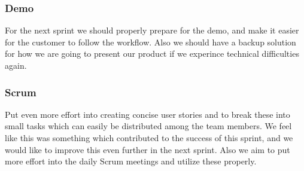 \subsubsection{Demo}
For the next sprint we should properly prepare for the demo, and make it easier for the customer to follow the workflow. Also we should have a backup solution for how we are going to present our product if we experince technical difficulties again.

\subsubsection{Scrum}
Put even more effort into creating concise user stories and to break these into small tasks which can easily be distributed among the team members. We feel like this was something which contributed to the success of this sprint, and we would like to improve this even further in the next sprint. Also we aim to put more effort into the daily Scrum meetings and utilize these properly.